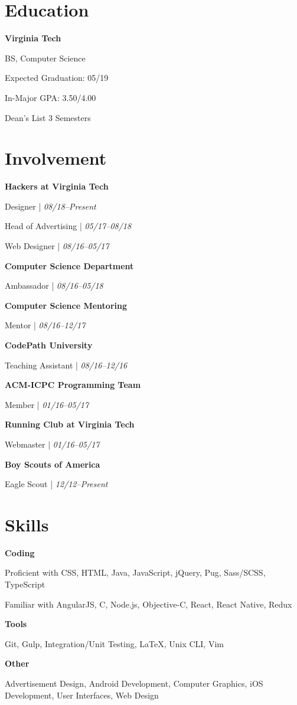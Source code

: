 \documentclass[9pt]{extarticle}
\newcommand{\Subsection}[2]{
    {\normalsize\bfseries\color{subsection}#1}
    \begin{trivlist}
        \color{bullet}#2
    \end{trivlist}
}
\newcommand{\ChronoItem}[2]{
    \item {\color{bullet}#1 | {\footnotesize\textit{#2}}}
}
\begin{document}
\begin{paracol}{2}
\begin{rightcolumn}
        \section{Education}
            \Subsection{Virginia Tech}{
                \item BS, Computer Science
                \item Expected Graduation: 05/19
                \item In-Major GPA: 3.50/4.00
                \item Dean's List 3 Semesters
            }
        \vfill
        \section{Involvement}
            \Subsection{Hackers at Virginia Tech}{
                \ChronoItem{Designer}{08/18--Present}
                \ChronoItem{Head of Advertising}{05/17--08/18}
                \ChronoItem{Web Designer}{08/16--05/17}
            }
            \vfill
            \Subsection{Computer Science Department}{
                \ChronoItem{Ambassador}{08/16--05/18}
            }
            \vfill
            \Subsection{Computer Science Mentoring}{
                \ChronoItem{Mentor}{08/16--12/17}
            }
            \vfill
            \Subsection{CodePath University}{
                \ChronoItem{Teaching Assistant}{08/16--12/16}
            }
            \vfill
            \Subsection{ACM-ICPC Programming Team}{
                \ChronoItem{Member}{01/16--05/17}
            }
            \vfill
            \Subsection{Running Club at Virginia Tech}{
                \ChronoItem{Webmaster}{01/16--05/17}
            }
            \vfill
            \Subsection{Boy Scouts of America}{
                \ChronoItem{Eagle Scout}{12/12--Present}
            }
        \vfill
        \section{Skills}
            \Subsection{Coding}{
                \item Proficient with CSS, HTML, Java, JavaScript, jQuery, Pug, Sass/SCSS, TypeScript
                \item Familiar with AngularJS, C, Node.js, Objective-C, React, React Native, Redux
            }
            \vfill
            \Subsection{Tools}{
                \item Git, Gulp, Integration/Unit Testing, LaTeX, Unix CLI, Vim
            }
            \vfill
            \Subsection{Other}{
                \item Advertisement Design, Android Development, Computer Graphics, iOS Development, User Interfaces, Web Design
            }
        \pagebreak
    \end{rightcolumn}
\end{paracol}
\end{document}
